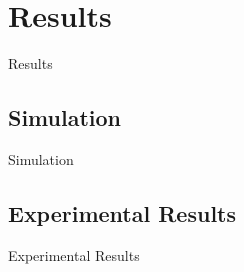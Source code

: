 
\chapter{Results}%
\label{chp:results}

Results

\section{Simulation}%
\label{sec:simulation}

Simulation

\section{Experimental Results}%
\label{sec:experimental-results}

Experimental Results
